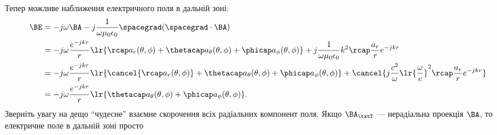 Тепер можливе наближення електричного поля в дальній зоні:
\begin{equation}\label{eqn:chapter4Notes:160}
\begin{aligned}
\BE
&= -j \omega \BA - j \frac{1}{\omega \mu_0 \epsilon_0} \spacegrad (\spacegrad \cdot \BA) \\
&=
-j \omega
\frac{e^{-j k r}}{r} \lr{
\rcap a_r(\theta, \phi)
+ \thetacap a_\theta(\theta, \phi)
+ \phicap a_\phi(\theta, \phi)
}
+ j \frac{1}{\omega \mu_0 \epsilon_0}
k^2 \rcap \frac{a_r}{r}
e^{-j k r} \\
&=
-j \omega
\frac{e^{-j k r}}{r} \lr{
\cancel{\rcap a_r(\theta, \phi)}
+ \thetacap a_\theta(\theta, \phi)
+ \phicap a_\phi(\theta, \phi)
}
+ \cancel{j \frac{c^2}{\omega}
\lr{\frac{\omega}{c}}^2 \rcap \frac{a_r}{r}
e^{-j k r}
} \\
&=
-j \omega
\frac{e^{-j k r}}{r} \lr{
\thetacap a_\theta(\theta, \phi)
+ \phicap a_\phi(\theta, \phi)
}.
\end{aligned}
\end{equation}
Зверніть увагу на дещо ``чудесне'' взаємне скорочення всіх радіальних компонент поля. Якщо \(\BA_\txtT\) — нерадіальна проекція \(\BA\), то електричне поле в дальній зоні просто

